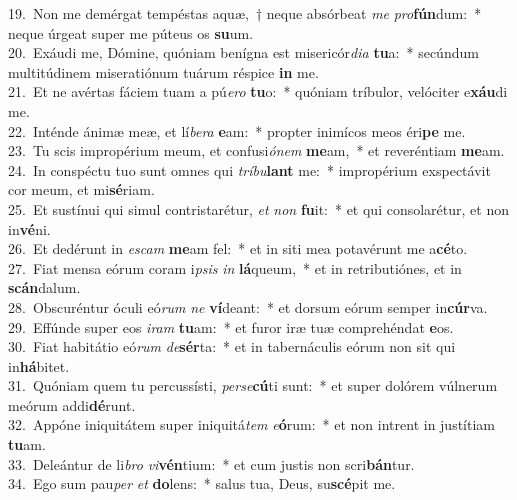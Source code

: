 {19.~}Non me demérgat tempéstas aquæ,~† neque absórbeat \textit{me} \textit{pro}\textbf{fún}dum:~* neque úrgeat super me púteus os \textbf{su}um.\\
{20.~}Exáudi me, Dómine, quóniam benígna est misericór\textit{di}\textit{a} \textbf{tu}a:~* secúndum multitúdinem miseratiónum tuárum réspice \textbf{in} me.\\
{21.~}Et ne avértas fáciem tuam a pú\textit{e}\textit{ro} \textbf{tu}o:~* quóniam tríbulor, velóciter e\textbf{xáu}di me.\\
{22.~}Inténde ánimæ meæ, et lí\textit{be}\textit{ra} \textbf{e}am:~* propter inimícos meos éri\textbf{pe} me.\\
{23.~}Tu scis impropérium meum, et confusi\textit{ó}\textit{nem} \textbf{me}am,~* et reveréntiam \textbf{me}am.\\
{24.~}In conspéctu tuo sunt omnes qui \textit{trí}\textit{bu}\textbf{lant} me:~* impropérium exspectávit cor meum, et mi\textbf{sé}riam.\\
{25.~}Et sustínui qui simul contristarétur, \textit{et} \textit{non} \textbf{fu}it:~* et qui consolarétur, et non in\textbf{vé}ni.\\
{26.~}Et dedérunt in \textit{e}\textit{scam} \textbf{me}am fel:~* et in siti mea potavérunt me a\textbf{cé}to.\\
{27.~}Fiat mensa eórum coram i\textit{psis} \textit{in} \textbf{lá}queum,~* et in retributiónes, et in \textbf{scán}dalum.\\
{28.~}Obscuréntur óculi eó\textit{rum} \textit{ne} \textbf{ví}deant:~* et dorsum eórum semper in\textbf{cúr}va.\\
{29.~}Effúnde super eos \textit{i}\textit{ram} \textbf{tu}am:~* et furor iræ tuæ comprehéndat \textbf{e}os.\\
{30.~}Fiat habitátio eó\textit{rum} \textit{de}\textbf{sér}ta:~* et in tabernáculis eórum non sit qui in\textbf{há}bitet.\\
{31.~}Quóniam quem tu percussísti, \textit{per}\textit{se}\textbf{cú}ti sunt:~* et super dolórem vúlnerum meórum addi\textbf{dé}runt.\\
{32.~}Appóne iniquitátem super iniquitá\textit{tem} \textit{e}\textbf{ó}rum:~* et non intrent in justítiam \textbf{tu}am.\\
{33.~}Deleántur de li\textit{bro} \textit{vi}\textbf{vén}tium:~* et cum justis non scri\textbf{bán}tur.\\
{34.~}Ego sum pau\textit{per} \textit{et} \textbf{do}lens:~* salus tua, Deus, su\textbf{scé}pit me.\\
